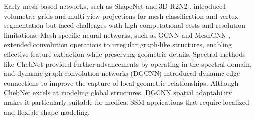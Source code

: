 Early mesh-based networks, such as ShapeNet \cite{chang2015shapenet} and 3D-R2N2 \cite{choy20163d}, introduced volumetric grids and multi-view projections for mesh classification and vertex segmentation but faced challenges with high computational costs and resolution limitations. Mesh-specific neural networks, such as GCNN \cite{zhang2019graph,kipf2016semi} and MeshCNN \cite{hanocka2019meshcnn}, extended convolution operations to irregular graph-like structures, enabling effective feature extraction while preserving geometric details. Spectral methods like ChebNet \cite{defferrard2016convolutional} provided further advancements by operating in the spectral domain, and dynamic graph convolution networks (DGCNN) \cite{wang2019dynamic} introduced dynamic edge connections to improve the capture of local geometric relationships. Although ChebNet excels at modeling global structures, DGCNN spatial adaptability makes it particularly suitable for medical SSM applications that require localized and flexible shape modeling. 

